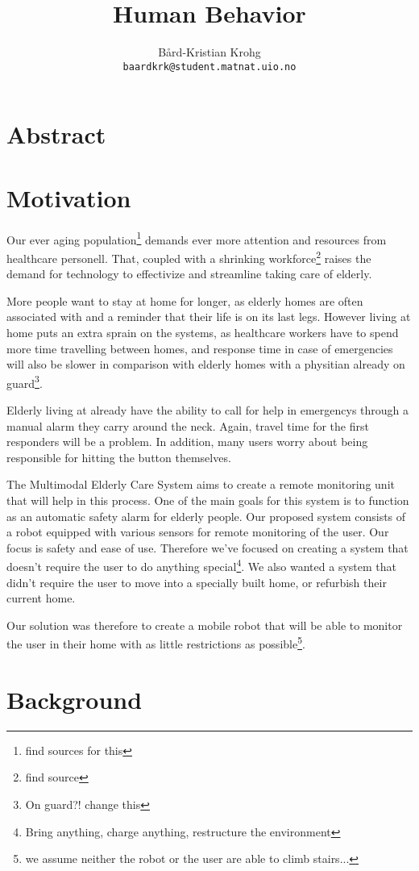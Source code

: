 \documentclass[a4paper]{report}
\title{Human Behavior}
\author{Bård-Kristian Krohg \\ \texttt{baardkrk@student.matnat.uio.no}}
\begin{document}
\maketitle
\section{Abstract}
\section{Motivation}
Our ever aging population\footnote{find sources for this} demands ever more attention and resources from healthcare personell. That, coupled with a shrinking workforce\footnote{find source} raises the demand for technology to effectivize and streamline taking care of elderly.

More people want to stay at home for longer, as elderly homes are often associated with and a reminder that their life is on its last legs. However living at home puts an extra sprain on the systems, as healthcare workers have to spend more time travelling between homes, and response time in case of emergencies will also be slower in comparison with elderly homes with a physitian already on guard\footnote{On guard?! change this}. 

Elderly living at already have the ability to call for help in emergencys through a manual alarm they carry around the neck. Again, travel time for the first responders will be a problem. In addition, many users worry about being responsible for hitting the button themselves.

The Multimodal Elderly Care System aims to create a remote monitoring unit that will help in this process. One of the main goals for this system is to function as an automatic safety alarm for elderly people. Our proposed system consists of a robot equipped with various sensors for remote monitoring of the user. Our focus is safety and ease of use. Therefore we've focused on creating a system that doesn't require the user to do anything special\footnote{Bring anything, charge anything, restructure the environment}. We also wanted a system that didn't require the user to move into a specially built home, or refurbish their current home.

Our solution was therefore to create a mobile robot that will be able to monitor the user in their home with as little restrictions as possible\footnote{we assume neither the robot or the user are able to climb stairs...}.

\section{Background}
\end{document}
